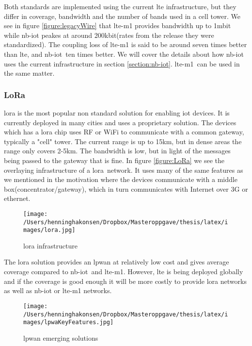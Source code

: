 \documentclass[USenglish]{ifimaster}  %
\begin{document}
Both standards are implemented using the current \acrshort{lte} infrastructure, but they differ in coverage, bandwidth and the number of bands used in a cell tower. We see in figure \vref{figure:legacyWire} that \acrshort{lte-m1} provides bandwidth up to 1\acrshort{mbit} while \acrshort{nb-iot} peakes at around 200\acrshort{kbit}(rates from the release they were standardized). The coupling loss of \acrshort{lte-m1} is said to be around seven times better than \acrshort{lte}, and \acrshort{nb-iot} ten times better. We will cover the details about how \acrshort{nb-iot} uses the current infrastructure in section \vref{section:nb-iot}. \acrshort{lte-m1} can be used in the same matter.

\subsubsection{LoRa \cite{online:LoRa}}
\acrshort{lora} is the most popular non standard solution for enabling \acrshort{iot} devices. It is currently deployed in many cities and uses a proprietary solution. The devices which has a \acrshort{lora} chip uses RF or WiFi to communicate with a common gateway, typically a "cell" tower. The current range is up to 15km, but in dense areas the range only covers 2-5km. The bandwidth is low, but in light of the messages being passed to the gateway that is fine. In figure \vref{figure:LoRa} we see the overlaying infrastructure of a \acrshort{lora} network. It uses many of the same features as we mentioned in the motivation where the devices communicate with a middle box(concentrator/gateway), which in turn communicates with Internet over 3G or ethernet.

\begin{figure}[ht]
  \centering\texttt{[image: /Users/henninghakonsen/Dropbox/Masteroppgave/thesis/latex/images/lora.jpg]}
  \caption{\acrshort{lora} infrastructure \cite{online:LoRa}}
  \label{figure:LoRa}
\end{figure}

The \acrshort{lora} solution provides an \acrshort{lpwan} at relatively low cost and gives average coverage compared to \acrshort{nb-iot} and \acrshort{lte-m1}. However, \acrshort{lte} is being deployed globally and if the coverage is good enough it will be more costly to provide \acrshort{lora} networks as well as \acrshort{nb-iot} or \acrshort{lte-m1} networks.

\begin{figure}[ht]
  \centering\texttt{[image: /Users/henninghakonsen/Dropbox/Masteroppgave/thesis/latex/images/lpwaKeyFeatures.jpg]}
  \caption{\acrshort{lpwan} emerging solutions \cite{online:legacyWire}}
  \label{figure:legacyWire}
\end{figure}
\end{document}
